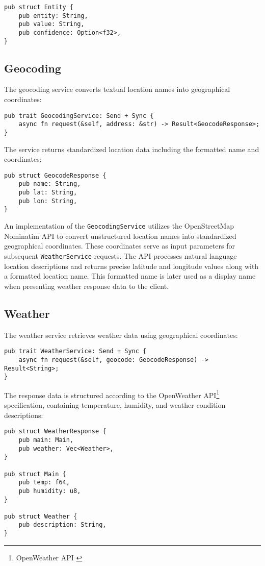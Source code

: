 \begin{verbatim}
pub struct Entity {
    pub entity: String,
    pub value: String,
    pub confidence: Option<f32>,
}
\end{verbatim}

\subsection{Geocoding}
The geocoding service converts textual location names into geographical coordinates:

\begin{verbatim}
pub trait GeocodingService: Send + Sync {
    async fn request(&self, address: &str) -> Result<GeocodeResponse>;
}
\end{verbatim}

The service returns standardized location data including the formatted name and coordinates:

\begin{verbatim}
pub struct GeocodeResponse {
    pub name: String,
    pub lat: String,
    pub lon: String,
}
\end{verbatim}

An implementation of the \texttt{GeocodingService} utilizes the OpenStreetMap Nominatim API
to convert unstructured location names into standardized geographical coordinates.
These coordinates serve as input parameters for subsequent \texttt{WeatherService} requests.
The API processes natural language location descriptions and returns precise latitude and longitude values along with a formatted location name.
This formatted name is later used as a display name when presenting weather response data to the client.

\subsection{Weather}
The weather service retrieves weather data using geographical coordinates:

\begin{verbatim}
pub trait WeatherService: Send + Sync {
    async fn request(&self, geocode: GeocodeResponse) -> Result<String>;
}
\end{verbatim}

The response data is structured according to the OpenWeather API\footnote{OpenWeather API \cite{openweathermap}} specification,
containing temperature, humidity, and weather condition descriptions:

\begin{verbatim}
pub struct WeatherResponse {
    pub main: Main,
    pub weather: Vec<Weather>,
}

pub struct Main {
    pub temp: f64,
    pub humidity: u8,
}

pub struct Weather {
    pub description: String,
}
\end{verbatim}

